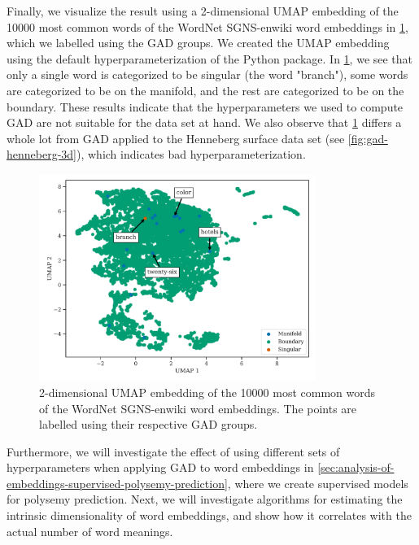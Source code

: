Finally, we visualize the result using a 2-dimensional UMAP embedding of the 10000 most common words of the WordNet SGNS-enwiki word embeddings in \cref{fig:gad-umap-2d-10k-most-common-wordnet-enwiki-words}, which we labelled using the GAD groups. We created the UMAP embedding using the default hyperparameterization of the  Python package. In \cref{fig:gad-umap-2d-10k-most-common-wordnet-enwiki-words}, we see that only a single word is categorized to be singular (the word "branch"), some words are categorized to be on the manifold, and the rest are categorized to be on the boundary. These results indicate that the hyperparameters we used to compute GAD are not suitable for the data set at hand. We also observe that \cref{fig:gad-umap-2d-10k-most-common-wordnet-enwiki-words} differs a whole lot from GAD applied to the Henneberg surface data set (see \cref{fig:gad-henneberg-3d}), which indicates bad hyperparameterization.
\begin{figure}[H]
    \centering
    \includegraphics[width=0.8\textwidth]{thesis/figures/gad-umap-2d-10k-most-common-wordnet-enwiki-words.pdf}
    \caption{2-dimensional UMAP embedding of the 10000 most common words of the WordNet SGNS-enwiki word embeddings. The points are labelled using their respective GAD groups.}
    \label{fig:gad-umap-2d-10k-most-common-wordnet-enwiki-words}
\end{figure}

Furthermore, we will investigate the effect of using different sets of hyperparameters when applying GAD to word embeddings in \cref{sec:analysis-of-embeddings-supervised-polysemy-prediction}, where we create supervised models for polysemy prediction. Next, we will investigate algorithms for estimating the intrinsic dimensionality of word embeddings, and show how it correlates with the actual number of word meanings.


